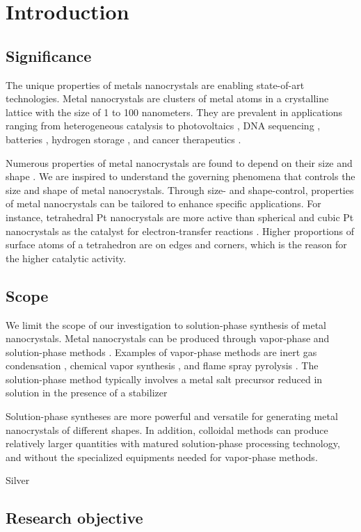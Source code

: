 \section{Introduction}

\subsection{Significance}

The unique properties of metals nanocrystals are enabling state-of-art technologies.
Metal nanocrystals are clusters of metal atoms in a crystalline lattice with the size of 1 to 100 nanometers.
They are prevalent in applications ranging from heterogeneous catalysis \cite{astruc2008nanoparticles,Astruc_2006} to photovoltaics \cite{Atwater_2010}, DNA sequencing \cite{McNally_2010}, batteries \cite{Panniello_2014}, hydrogen storage \cite{Jena_2011,Ramos_Castillo_2015}, and cancer therapeutics \cite{Jain_2010,Kim_2010}.

Numerous properties of metal nanocrystals are found to depend on their size \cite{Roduner_2006} and shape \cite{Xia_2008}.
We are inspired to understand the governing phenomena that controls the size and shape of metal nanocrystals.
Through size- and shape-control, properties of metal nanocrystals can be tailored to enhance specific applications.
For instance, tetrahedral Pt nanocrystals are more active than spherical and cubic Pt nanocrystals as the catalyst for electron-transfer reactions \cite{Narayanan_2005}.
Higher proportions of surface atoms of a tetrahedron are on edges and corners, which is the reason for the higher catalytic activity.

\subsection{Scope}

We limit the scope of our investigation to solution-phase synthesis of metal nanocrystals.
Metal nanocrystals can be produced through vapor-phase \cite{Swihart_2003} and solution-phase methods \cite{Tao_2008}. Examples of vapor-phase methods are inert gas condensation \cite{Wegner_2002,Simchi_2007}, chemical vapor synthesis \cite{Lee_2012,Ostraat_2001}, and flame spray pyrolysis \cite{Teoh_2010}. 
The solution-phase method typically involves a metal salt precursor reduced in solution in the presence of a stabilizer


Solution-phase syntheses are more powerful and versatile for generating metal nanocrystals of different shapes.
In addition, colloidal methods can produce relatively larger quantities with matured solution-phase processing technology, and without the specialized equipments needed for vapor-phase methods.

Silver

\subsection{Research objective}


    
    
    